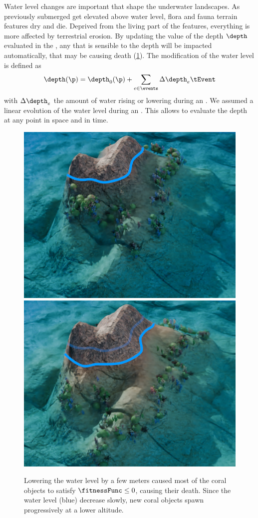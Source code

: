 Water level changes are important  that shape the underwater landscapes. As previously submerged  get elevated above water level, flora and fauna terrain features dry and die. Deprived from the living part of the features, everything is more affected by terrestrial erosion. By updating the value of the depth $\depth$ evaluated in the , any  that is sensible to the depth will be impacted automatically, that may be causing death (\cref{fig:semantic-representation_water-event}). The modification of the water level is defined as 
\begin{align*}
    \depth(\p) = \depth_0(\p) + \sum_{e \in \events} \Delta \depth_e \tEvent
\end{align*}
with $\Delta \depth_e$ the amount of water rising or lowering during an . We assumed a linear evolution of the water level during an . This allows to evaluate the depth at any point in space and in time.

\begin{figure}
    \includegraphics[width = 0.45 \linewidth]{Figures/Interactions/InteractionWater1.png}
    \includegraphics[width = 0.45 \linewidth]{Figures/Interactions/InteractionWater3.png}
    \caption{Lowering the water level by a few meters caused most of the coral objects to satisfy $\fitnessFunc \leq 0$, causing their death. Since the water level (blue) decrease slowly, new coral objects spawn progressively at a lower altitude.}
    \label{fig:semantic-representation_water-event}
\end{figure}

